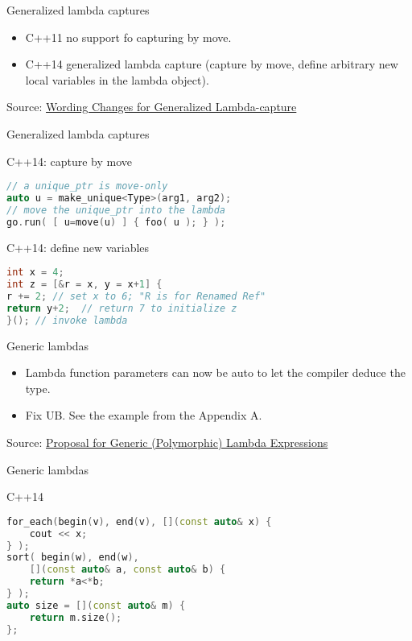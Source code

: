 \documentclass{beamer}
\begin{document}
\begin{frame}{Generalized lambda captures}
\begin{itemize}
\item C++11 no support fo capturing by move. 
\item C++14 generalized lambda capture (capture by move, define arbitrary new local variables in the lambda object).
\end{itemize}

\vfill
Source: \href{http://www.open-std.org/jtc1/sc22/wg21/docs/papers/2013/n3648.html}{Wording Changes for Generalized Lambda-capture}

\end{frame}


\begin{frame}[fragile]{Generalized lambda captures}
\begin{block}{C++14: capture by move}
\begin{lstlisting}[firstnumber=1, label=glabels, xleftmargin=5pt, language=C++]
// a unique_ptr is move-only 
auto u = make_unique<Type>(arg1, arg2);
// move the unique_ptr into the lambda 
go.run( [ u=move(u) ] { foo( u ); } );
\end{lstlisting} 
\end{block}

\begin{block}{C++14: define new variables}
\begin{lstlisting}[firstnumber=1, label=glabels, xleftmargin=5pt, language=C++] 
int x = 4;
int z = [&r = x, y = x+1] {
r += 2; // set x to 6; "R is for Renamed Ref"
return y+2;  // return 7 to initialize z
}(); // invoke lambda
\end{lstlisting}
\end{block}
\end{frame}

\begin{frame}{Generic lambdas}
\begin{itemize}
\item Lambda function parameters can now be auto to let the compiler deduce the type.
\item Fix UB. See the example from the Appendix A.
\end{itemize}

\vfill
Source: \href{http://www.open-std.org/jtc1/sc22/wg21/docs/papers/2013/n3559.pdf}{Proposal for Generic (Polymorphic) Lambda Expressions}
\end{frame}

\begin{frame}[fragile]{Generic lambdas}
\begin{block}{C++14}
\begin{lstlisting}[firstnumber=1, label=glabels, xleftmargin=5pt, language=C++] 
for_each(begin(v), end(v), [](const auto& x) { 
	cout << x; 
} );
sort( begin(w), end(w), 
	[](const auto& a, const auto& b) { 
	return *a<*b; 
} );
auto size = [](const auto& m) { 
	return m.size(); 
};
\end{lstlisting}
\end{block}
\end{frame}
\end{document}
